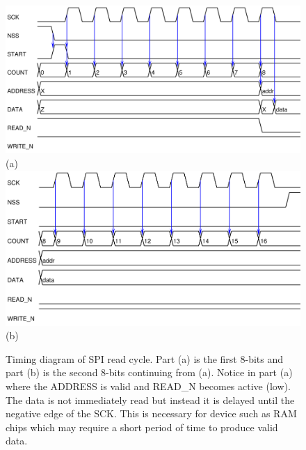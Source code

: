 \documentclass{article}
\begin{document}
\begin{figure}
\center
\includegraphics[scale=0.7]{figure/spi_ctl-timing/read-byte1} \\
(a) \\
\includegraphics[scale=0.7]{figure/spi_ctl-timing/read-byte2} \\
(b)
\caption{Timing diagram of SPI read cycle.
Part (a) is the first 8-bits and part (b) is the second
8-bits continuing from (a).
Notice in part (a) where the ADDRESS is valid and READ\_N becomes active (low).
The data is not immediately read but instead it is delayed until
the negative edge of the SCK.
This is necessary for device such as RAM chips which may
require a short period of time to produce valid data.}
\label{fig:spi_read}
\end{figure}
\end{document}
